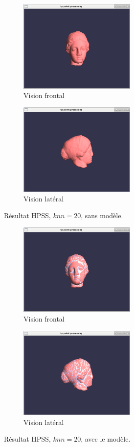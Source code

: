 \documentclass[a4,12pt]{report}
\begin{document}
\begin{figure}[!h]
	\centering
	\begin{subfigure}[b]{0.5\textwidth}
		\centering
		\includegraphics[height=1.8in]{figs/caso1-knn20-frontal-sem.png}
		\caption{Vision frontal}
	\end{subfigure}%
	\begin{subfigure}[b]{0.5\textwidth}
		\centering
		\includegraphics[height=1.8in]{figs/caso1-knn20-lateral-sem.png}
		\caption{Vision latéral}
	\end{subfigure}
	\caption{Résultat HPSS, $knn=20$, sans modèle.}
	\label{fig:1}
\end{figure}
\nopagebreak[4]
\begin{figure}[!h]
	\centering
	\begin{subfigure}[b]{0.5\textwidth}
		\centering
		\includegraphics[height=1.8in]{figs/caso1-knn20-frontal-com.png}
		\caption{Vision frontal}
	\end{subfigure}%
	\begin{subfigure}[b]{0.5\textwidth}
		\centering
		\includegraphics[height=1.8in]{figs/caso1-knn20-lateral-com.png}
		\caption{Vision latéral}
	\end{subfigure}
	\label{fig:2}
	\caption{Résultat HPSS, $knn=20$, avec le modèle.}
\end{figure}
\end{document}
